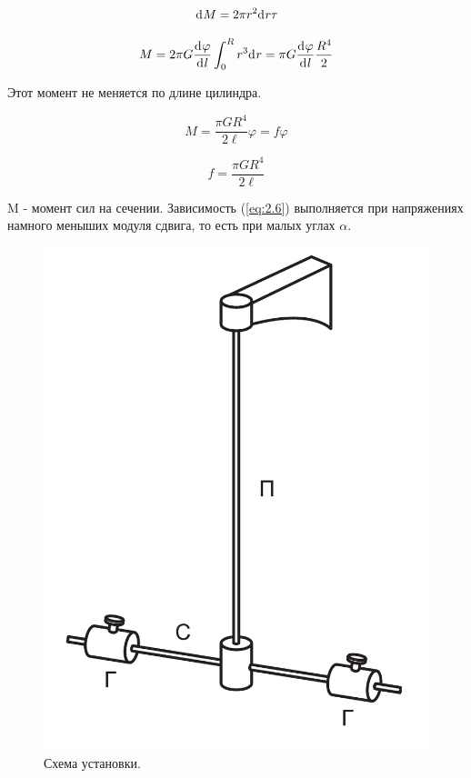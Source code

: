 \documentclass[a4paper,12pt]{article}
\numberwithin{equation}{section}
\begin{document}
\begin{equation}
  \d{M} = 2\pi r^2 \d{r} \tau \label{eq:2.4}
\end{equation}

\begin{equation}
  M = 2\pi G \deriv{\varphi}{l} \int_0^R{r^3 \d{r}} = 
  \pi G \deriv{\varphi}{l} \frac{R^4}{2} \label{eq:2.5}
\end{equation}

Этот момент не меняется по длине цилиндра.

\begin{equation}
  M = \frac {\pi G R^4}{2\ell} \varphi = f \varphi \label{eq:2.6}
\end{equation}

\begin{equation}
  f = \frac {\pi G R^4}{2\ell} \label{eq:2.7}
\end{equation}

M - момент сил на сечении.
Зависимость (\ref{eq:2.6}) выполняется при напряжениях намного меныших модуля сдвига, то есть при малых углах $\alpha$.

\begin{figure} [H] \center
  \includegraphics[scale = 0.4]{data/2 pic 2.png}
  \caption{Схема установки. \label{pic:4}}
\end{figure}
\end{document}
